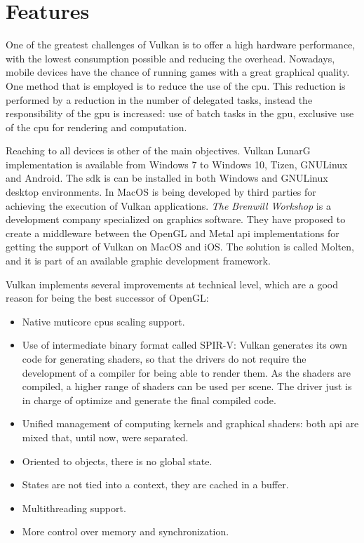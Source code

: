 \chapter{Features}\label{ch:features}
One of the greatest challenges of Vulkan is to offer a high hardware performance, with the lowest consumption possible
and reducing the overhead. Nowadays, mobile devices have the chance of running games with a great graphical quality.
One method that is employed is to reduce the use of the \gls{cpu}. This reduction is performed by a reduction in the
number of delegated tasks, instead the responsibility of the \gls{gpu} is increased: use of batch tasks in the
\gls{gpu}, exclusive use of the cpu for rendering and computation.

Reaching to all devices is other of the main objectives. Vulkan LunarG implementation is available from Windows 7 to
Windows 10, Tizen, GNU\/Linux and Android. The \gls{sdk} is can be installed in both Windows and GNU\/Linux desktop
environments. In MacOS is being developed by third parties for achieving the execution of Vulkan applications. \emph{The
Brenwill Workshop} is a development company specialized on graphics software. They have proposed to create a middleware
between the OpenGL and Metal \gls{api} implementations for getting the support of Vulkan on MacOS and iOS. The solution
is called Molten, and it is part of an available graphic development framework.

Vulkan implements several improvements at technical level, which are a good reason for being the best successor of
OpenGL:
\begin{itemize}
    \item Native muticore \gls{cpu}s scaling support.
    \item Use of intermediate binary format called SPIR-V: Vulkan generates its own code for generating shaders, so
    that the drivers do not require the development of a compiler for being able to render them. As the shaders are
    compiled, a higher range of shaders can be used per scene. The driver just is in charge of optimize and generate
    the final compiled code.
    \item Unified management of computing kernels and graphical shaders: both \gls{api} are mixed that, until now, were
    separated.
    \item Oriented to objects, there is no global state.
    \item States are not tied into a context, they are cached in a buffer.
    \item Multithreading support.
    \item More control over memory and synchronization.
\end{itemize}

